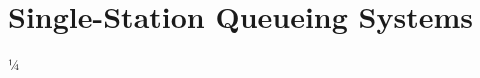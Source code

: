 \documentclass[a4paper,11pt]{scrbook}
\begin{document}
%
%

\chapter{Single-Station Queueing Systems}

%
%
%
%
¼
%
%

\begin{comment}



















%
 

 










\end{comment}





\end{document}
